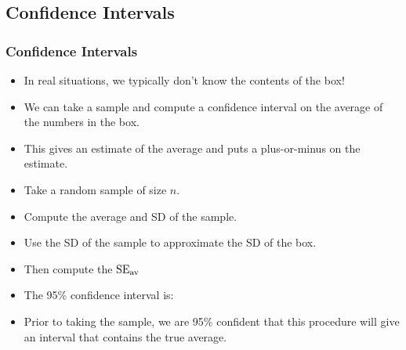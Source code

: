 \documentclass[t]{beamer}
\begin{document}
\subsection{Confidence Intervals}
\begin{frame}
\frametitle{Confidence Intervals}

\footnotesize
\begin{itemize}
\item In real situations, we typically don't know the contents of the box!
\item<2-> We can take a sample and  compute a {\color{blue}confidence 
   interval} on the average of the numbers in the box.
\item<3-> This gives an estimate of the average and puts a plus-or-minus on the estimate.
\vspace{-10pt}
\end{itemize}


\begin{itemize}
\item<5-> Take a random sample of size $n$.
\item<6-> Compute the average and SD of the sample.
\item<7-> Use the SD of the sample to approximate the SD of the box.
\item<8-> Then compute the $\mbox{SE}_{\mbox{\scriptsize av}}$
\item<9-> The 95\% confidence interval is:\vspace{-15pt}
\end{itemize}

\vspace{-8pt}

\begin{itemize}
\item<10-> \color{darkgreen} 
  Prior to taking the sample, we are 95\% confident that this procedure will 
   give an interval that contains the true average.
\end{itemize}

\end{frame}
\end{document}

